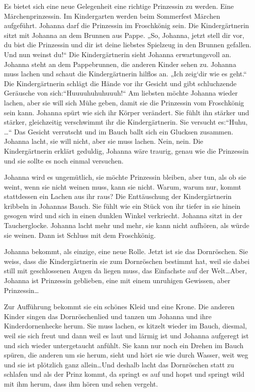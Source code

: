 \sterne


Es bietet sich eine neue Gelegenheit eine richtige Prinzessin zu werden. Eine Märchenprinzessin. Im Kindergarten werden beim Sommerfest Märchen aufgeführt. Johanna darf die Prinzessin im Froschkönig sein. Die Kindergärtnerin sitzt mit Johanna an dem Brunnen aus Pappe. „So, Johanna, jetzt stell dir vor, du bist die Prinzessin und dir ist deine liebstes Spielzeug in den Brunnen gefallen. Und nun weinst du!“ Die Kindergärtnerin sieht Johanna erwartungsvoll an. Johanna steht an dem Pappebrunnen, die anderen Kinder sehen zu. Johanna muss lachen und schaut die Kindergärtnerin hilflos an. „Ich zeig`dir wie es geht.“ Die Kindergärtnerin schlägt die Hände vor ihr Gesicht und gibt schluchzende Geräusche von sich:“Huuuuhuhuhuuuh!“ Am liebsten möchte Johanna wieder lachen, aber sie will sich Mühe geben, damit sie die Prinzessin vom Froschkönig sein kann. Johanna spürt wie sich ihr Körper verändert. Sie fühlt ihn stärker und stärker, gleichzeitig verschwimmt ihr die Kindergärtnerin. Sie versucht es:“Huhu, \dots“ Das Gesicht verrutscht und im Bauch ballt sich ein Glucksen zusammen. Johanna lacht, sie will nicht, aber sie muss lachen.
Nein, nein. Die Kindergärtnerin erklärt geduldig, Johanna wäre traurig, genau wie die Prinzessin und sie sollte es noch einmal versuchen.

Johanna wird es ungemütlich, sie möchte Prinzessin bleiben, aber tun, als ob sie weint, wenn sie nicht weinen muss, kann sie nicht. Warum, warum nur, kommt stattdessen ein Lachen aus ihr raus? Die Enttäuschung der Kindergärtnerin kribbeln in Johannas Bauch. Sie fühlt wie ein Stück von ihr tiefer  in sie hinein gesogen wird und sich in einen dunklen Winkel verkriecht. Johanna sitzt in der Taucherglocke. Johanna lacht mehr und mehr, sie kann nicht aufhören, als würde sie weinen. Dann ist Schluss mit dem Froschkönig. 

Johanna bekommt, als einzige, eine neue Rolle. Jetzt ist sie das Dornröschen. Sie weiss, dass die Kindergärtnerin sie zum Dornröschen bestimmt hat, weil sie dabei still mit geschlossenen Augen da liegen muss, das Einfachste auf der Welt\dots Aber, Johanna ist Prinzessin geblieben, eine mit einem unruhigen Gewissen, aber Prinzessin\dots

Zur Aufführung bekommt sie ein schönes Kleid und eine Krone. Die anderen Kinder singen das Dornröschenlied und tanzen um Johanna und ihre Kinderdornenhecke herum. Sie muss lachen, es kitzelt wieder im Bauch, diesmal, weil sie sich freut und dann weil es laut und lärmig ist und Johanna aufgeregt ist und sich wieder untergetaucht anfühlt. Sie kann nur noch ein Drehen im Bauch spüren, die anderen um sie herum, sieht und hört sie wie durch Wasser, weit weg und sie ist plötzlich ganz allein\dots Und deshalb lacht das Dornröschen statt zu schlafen und als der Prinz kommt, da springt es auf und hopst und springt wild mit ihm herum, dass ihm hören und sehen vergeht. 

